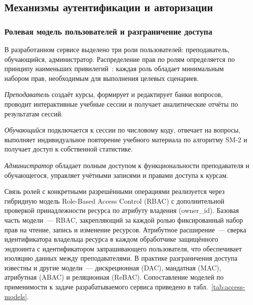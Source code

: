\subsection{Механизмы аутентификации и авторизации}

\subsubsection{Ролевая модель пользователей и разграничение доступа}

В разработанном сервисе выделено три роли пользователей:
преподаватель, обучающийся, администратор. Распределение прав
по ролям определяется по принципу наименьших
привилегий~\cite{owasp_top10,gost58833}: каждая роль обладает
минимальным набором прав, необходимым для выполнения целевых
сценариев.

\emph{Преподаватель} создаёт курсы, формирует и редактирует банки
вопросов, проводит интерактивные учебные сессии и получает
аналитические отчёты по результатам сессий.

\emph{Обучающийся} подключается к сессии по числовому коду,
отвечает на вопросы, выполняет индивидуальное повторение учебного
материала по алгоритму SM-2 и получает доступ к собственной
статистике.

\emph{Администратор} обладает полным доступом к функциональности
преподавателя и обучающегося, управляет учётными записями
и правами доступа к курсам.

Связь ролей с конкретными разрешёнными операциями реализуется
через гибридную модель Role-Based Access Control (RBAC)
с дополнительной проверкой принадлежности ресурса по атрибуту
владения (owner\_id). Базовая часть модели~--- RBAC,
закрепляющий за каждой ролью фиксированный набор прав на чтение,
запись и изменение ресурсов. Атрибутное расширение~--- сверка
идентификатора владельца ресурса в каждом обработчике защищённого
эндпоинта с идентификатором запрашивающего пользователя, что
обеспечивает изоляцию данных между преподавателями. В практике
разграничения доступа известны и другие модели~--- дискреционная
(DAC), мандатная (MAC), атрибутная (ABAC) и реляционная (ReBAC).
Сопоставление моделей по применимости к задаче разрабатываемого
сервиса приведено в табл.~\ref{tab:access-models}.

